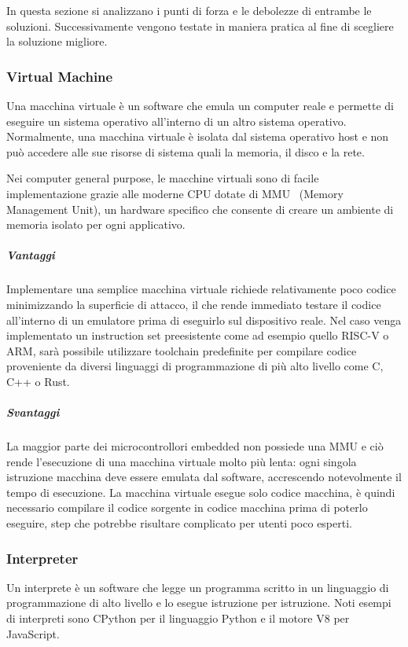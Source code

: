 In questa sezione si analizzano i punti di forza e le debolezze di entrambe le soluzioni. Successivamente 
vengono testate in maniera pratica al fine di scegliere la soluzione migliore.

\subsubsection{Virtual Machine}

Una macchina virtuale è un software che emula un computer reale e permette di eseguire un sistema operativo all'interno di un altro sistema operativo.
Normalmente, una macchina virtuale è isolata dal sistema operativo host e non può accedere alle sue risorse di sistema quali 
la memoria, il disco e la rete.

Nei computer general purpose, le macchine virtuali sono di facile implementazione grazie alle moderne CPU dotate 
di MMU~\cite{olivieri2022land} (Memory Management Unit), un hardware specifico che consente di creare un ambiente di memoria isolato per ogni applicativo.

\subparagraph{Vantaggi}

Implementare una semplice macchina virtuale richiede relativamente poco codice minimizzando la superficie di 
attacco, il che rende immediato testare il codice all'interno di un emulatore prima di eseguirlo sul dispositivo reale.
Nel caso venga implementato un instruction set preesistente come ad esempio quello RISC-V o ARM, sarà possibile
utilizzare toolchain predefinite per compilare codice proveniente da diversi linguaggi di programmazione di più alto livello
come C, C++ o Rust.

\subparagraph{Svantaggi}

La maggior parte dei microcontrollori embedded non possiede una MMU e ciò rende l'esecuzione di una macchina virtuale molto più lenta: 
ogni singola istruzione macchina deve essere emulata dal software, accrescendo notevolmente il tempo di esecuzione.
La macchina virtuale esegue solo codice macchina, è quindi necessario compilare il codice sorgente in codice macchina 
prima di poterlo eseguire, step che potrebbe risultare complicato per utenti poco esperti.

\subsubsection{Interpreter}

Un interprete è un software che legge un programma scritto in un linguaggio di programmazione di alto livello e lo esegue istruzione per istruzione.
Noti esempi di interpreti sono CPython per il linguaggio Python e il motore V8 per JavaScript.

